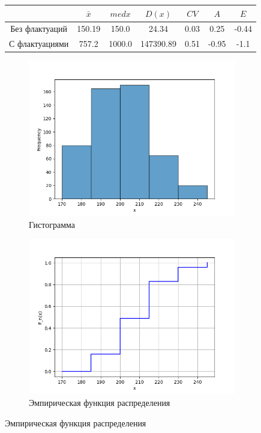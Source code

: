 \documentclass[12pt,a4paper]{article}
\begin{document}
\begin{figure}
		\begin{subtable}[htbp!]{0.8\textwidth}
			\centering
			\begin{tabular}{ |c|c|c|c|c|c|c| }
				\hline
				& \( \bar x \) & \( med x \) & \( D(x) \) & \( CV \) & \( A \) & \( E \) \\
				\hline
				Без флактуаций & 150.19 & 150.0 & 24.34 & 0.03 & 0.25 & -0.44 \\
				\hline
				С флактуациями & 757.2 & 1000.0 & 147390.89 & 0.51 & -0.95 & -1.1 \\
				\hline
			\end{tabular}
		\end{subtable}
	\end{figure}

	\begin{figure}
		\begin{subfigure}[htbp!]{0.8\textwidth}
			\begin{center}
				\includegraphics[width = 0.8\linewidth]{../graphics/7_hist.png}
				\caption{Гистограмма}
			\end{center}
		\end{subfigure}

		\begin{subfigure}[htbp!]{0.8\textwidth}
			\begin{center}
				\includegraphics[width = 0.8\linewidth]{../graphics/7_cdf.png}
				\caption{Эмпирическая функция распределения}
			\end{center}
		\end{subfigure}


\end{figure}
\end{document}
